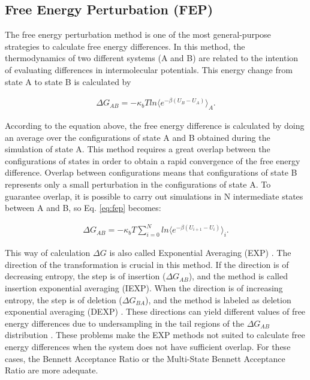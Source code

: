 \subsection{Free Energy Perturbation (FEP)}
The free energy perturbation method \cite{zwanzig1954} is one of the most general-purpose strategies to calculate free energy differences. In this method, the thermodynamics of two different systems (A and B) are related to the intention of evaluating differences in intermolecular potentials. This energy change from state A to state B is calculated by  

\begin{equation}
\label{eq:fep}
\begin{aligned}
\Delta G_{AB} = -\kappa_{b}T ln \langle{e^{-\beta (U_{B}-U_{A})}}\rangle_{A} .
\end{aligned}
\end{equation}

According to the equation above, the free energy difference is calculated by doing an average over the configurations of state A and B obtained during the simulation of state A. This method requires a great overlap between the configurations of states in order to obtain a rapid convergence of the free energy difference. Overlap between configurations means that configurations of state B represents only a small perturbation in the configurations of state A. To guarantee overlap, it is possible to carry out simulations in N intermediate states between A and B, so Eq. \eqref{eq:fep} becomes:

\begin{equation}
\label{eq:fepint}
\begin{aligned}
\Delta G_{AB} = -\kappa_{b}T  \sum_{i=0}^{N}
ln \langle {e^{-\beta (U_{i+1}-U_{i})}} \rangle_{i} .
\end{aligned}
\end{equation}

This way of calculation $\Delta G$ is also called Exponential Averaging (EXP) \cite{zwanzig1955,bareva}. The direction of the transformation is crucial in this method. If the direction is of decreasing entropy, the step is of insertion ($\Delta G_{AB}$), and the method is called insertion exponential averaging (IEXP). When the direction is of increasing entropy, the step is of deletion ($\Delta G_{BA}$), and the method is labeled as deletion exponential averaging (DEXP) \cite{bareva}. These directions can yield different values of free energy differences due to undersampling in the tail regions of the $\Delta G_{AB}$ distribution \cite{klimovich,pohorille2010}. These problems make the EXP methods not suited to calculate free energy differences when the system does not have sufficient overlap. For these cases, the Bennett Acceptance Ratio or the Multi-State Bennett Acceptance Ratio are more adequate.   


